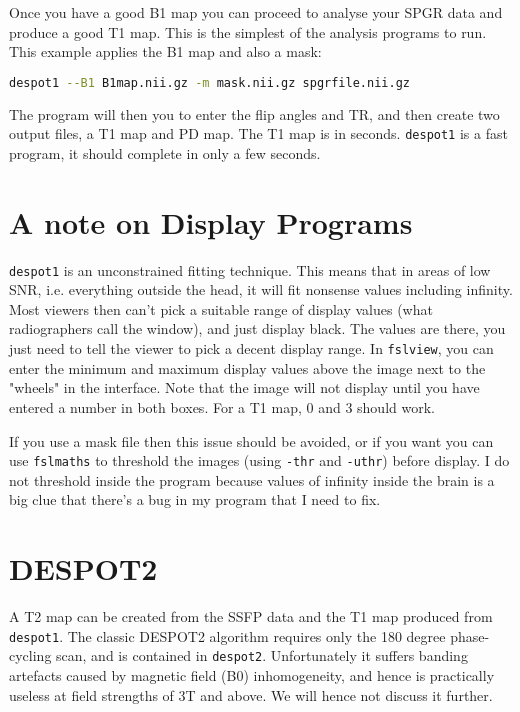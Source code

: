\documentclass{report}
\begin{document}
Once you have a good B1 map you can proceed to analyse your SPGR data and produce a good T1 map. This is the simplest of the analysis programs to run. This example applies the B1 map and also a mask:

\begin{lstlisting}[language=sh]
despot1 --B1 B1map.nii.gz -m mask.nii.gz spgrfile.nii.gz
\end{lstlisting}

The program will then you to enter the flip angles and TR, and then create two output files, a T1 map and PD map. The T1 map is in seconds. \texttt{despot1} is a fast program, it should complete in only a few seconds.

\section{A note on Display Programs}

\texttt{despot1} is an unconstrained fitting technique. This means that in areas of low SNR, i.e. everything outside the head, it will fit nonsense values including infinity. Most viewers then can't pick a suitable range of display values (what radiographers call the window), and just display black. The values are there, you just need to tell the viewer to pick a decent display range. In \texttt{fslview}, you can enter the minimum and maximum display values above the image next to the "wheels" in the interface. Note that the image will not display until you have entered a number in both boxes. For a T1 map, 0 and 3 should work.

If you use a mask file then this issue should be avoided, or if you want you can use \texttt{fslmaths} to threshold the images (using \texttt{-thr} and \texttt{-uthr}) before display. I do not threshold inside the program because values of infinity inside the brain is a big clue that there's a bug in my program that I need to fix.

\section{DESPOT2}

A T2 map can be created from the SSFP data and the T1 map produced from \texttt{despot1}. The classic DESPOT2 algorithm requires only the 180 degree phase-cycling scan, and is contained in \texttt{despot2}. Unfortunately it suffers banding artefacts caused by magnetic field (B0) inhomogeneity, and hence is practically useless at field strengths of 3T and above. We will hence not discuss it further.
\end{document}
